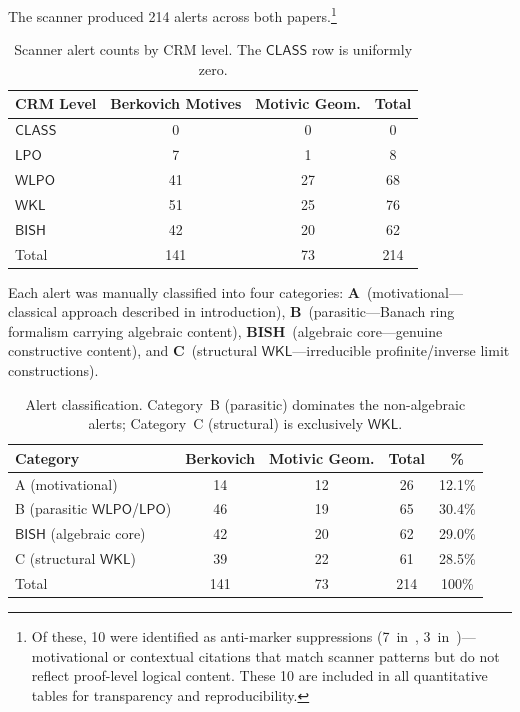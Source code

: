 \documentclass[11pt,a4paper]{article}
\theoremstyle{plain}
\theoremstyle{definition}
\newcommand{\BISH}{\textsf{BISH}}
\newcommand{\WKL}{\textsf{WKL}}
\newcommand{\WLPO}{\textsf{WLPO}}
\newcommand{\LPO}{\textsf{LPO}}
\newcommand{\CLASS}{\textsf{CLASS}}
\begin{document}
The scanner produced 214 alerts across both papers.\footnote{Of these, 10 were identified as anti-marker suppressions (7~in~\cite{scholze-berkovich}, 3~in~\cite{scholze-motivic-geometrization})---motivational or contextual citations that match scanner patterns but do not reflect proof-level logical content.  These 10 are included in all quantitative tables for transparency and reproducibility.}

\begin{table}[h]
\centering
\begin{tabular}{@{}lccc@{}}
\toprule
\textbf{CRM Level} & \textbf{Berkovich Motives} & \textbf{Motivic Geom.} & \textbf{Total} \\
\midrule
$\CLASS$ & 0 & 0 & 0 \\
$\LPO$ & 7 & 1 & 8 \\
$\WLPO$ & 41 & 27 & 68 \\
$\WKL$ & 51 & 25 & 76 \\
$\BISH$ & 42 & 20 & 62 \\
\midrule
Total & 141 & 73 & 214 \\
\bottomrule
\end{tabular}
\caption{Scanner alert counts by CRM level. The $\CLASS$ row is uniformly zero.}
\label{tab:scanner-level}
\end{table}

Each alert was manually classified into four categories: \textbf{A}~(motivational---classical approach described in introduction), \textbf{B}~(parasitic---Banach ring formalism carrying algebraic content), \textbf{BISH}~(algebraic core---genuine constructive content), and \textbf{C}~(structural $\WKL$---irreducible profinite/inverse limit constructions).

\begin{table}[h]
\centering
\begin{tabular}{@{}lcccc@{}}
\toprule
\textbf{Category} & \textbf{Berkovich} & \textbf{Motivic Geom.} & \textbf{Total} & \textbf{\%} \\
\midrule
A (motivational) & 14 & 12 & 26 & 12.1\% \\
B (parasitic $\WLPO$/$\LPO$) & 46 & 19 & 65 & 30.4\% \\
$\BISH$ (algebraic core) & 42 & 20 & 62 & 29.0\% \\
C (structural $\WKL$) & 39 & 22 & 61 & 28.5\% \\
\midrule
Total & 141 & 73 & 214 & 100\% \\
\bottomrule
\end{tabular}
\caption{Alert classification. Category~B (parasitic) dominates the non-algebraic alerts; Category~C (structural) is exclusively $\WKL$.}
\label{tab:scanner-classification}
\end{table}
\end{document}

